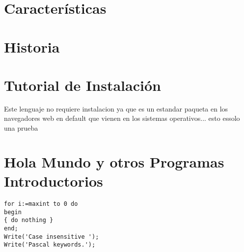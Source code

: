 \documentclass[11pt]{article} %
\begin{document}
\section{Características}
\section{Historia}
\section{Tutorial de Instalación}
Este lenguaje no requiere instalacion ya que es un estandar paqueta en los navegadores web en default que vienen en los sistemas operativos... esto essolo una prueba
\section{Hola Mundo y otros Programas Introductorios}

\lstset{language=Pascal}          %

\begin{lstlisting}[frame=single]  % Start your code-block
for i:=maxint to 0 do
begin
{ do nothing }
end;
Write('Case insensitive ');
Write('Pascal keywords.');
\end{lstlisting}
\end{document}
